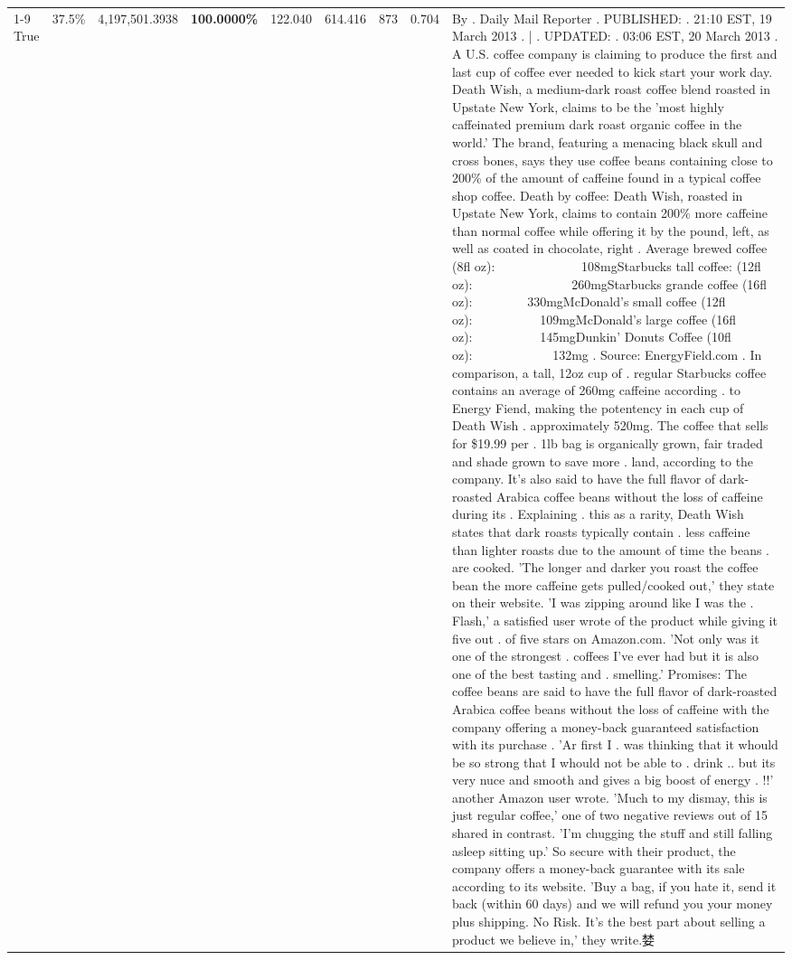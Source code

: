 \begin{table}[H]
{\begin{tabular}{lllrlllll}
\cline{1-9} \cline{2-9}
True & 37.5\% & 4,197,501.3938 & \bfseries \color{red} 100.0000\% & 122.040 & 614.416 & 873 & 0.704 & By . Daily Mail Reporter . PUBLISHED: . 21:10 EST, 19 March 2013 . | . UPDATED: . 03:06 EST, 20 March 2013 . A U.S. coffee company is claiming to produce the first and last cup of coffee ever needed to kick start your work day. Death Wish, a medium-dark roast coffee blend roasted in Upstate New York, claims to be the 'most highly caffeinated premium dark roast organic coffee in the world.' The brand, featuring a menacing black skull and cross bones, says they use coffee beans containing close to 200\% of the amount of caffeine found in a typical coffee shop coffee. Death by coffee: Death Wish, roasted in Upstate New York, claims to contain 200\% more caffeine than normal coffee while offering it by the pound, left, as well as coated in chocolate, right . Average brewed coffee (8fl oz):              108mgStarbucks tall coffee: (12fl oz):                260mgStarbucks grande coffee (16fl oz):         330mgMcDonald's small coffee (12fl oz):           109mgMcDonald's large coffee (16fl oz):           145mgDunkin' Donuts Coffee (10fl oz):             132mg . Source: EnergyField.com . In comparison, a tall, 12oz cup of . regular Starbucks coffee contains an average of 260mg caffeine according . to Energy Fiend, making the potentency in each cup of Death Wish . approximately 520mg. The coffee that sells for \$19.99 per . 1lb bag is organically grown, fair traded and shade grown to save more . land, according to the company. It's also said to have the full flavor of dark-roasted Arabica coffee beans without the loss of caffeine during its . Explaining . this as a rarity, Death Wish states that dark roasts typically contain . less caffeine than lighter roasts due to the amount of time the beans . are cooked. 'The longer and darker you roast the coffee bean the more caffeine gets pulled/cooked out,' they state on their website. 'I was zipping around like I was the . Flash,' a satisfied user wrote of the product while giving it five out . of five stars on Amazon.com. 'Not only was it one of the strongest . coffees I've ever had but it is also one of the best tasting and . smelling.’ Promises: The coffee beans are said to have the full flavor of dark-roasted Arabica coffee beans without the loss of caffeine with the company offering a money-back guaranteed satisfaction with its purchase . 'Ar first I . was thinking that it whould be so strong that I whould not be able to . drink .. but its very nuce and smooth and gives a big boost of energy . !!' another Amazon user wrote. 'Much to my dismay, this is just regular coffee,' one of two negative reviews out of 15 shared in contrast. 'I'm chugging the stuff and still falling asleep sitting up.' So secure with their product, the company offers a money-back guarantee with its sale according to its website. 'Buy a bag, if you hate it, send it back (within 60 days) and we will refund you your money plus shipping. No Risk. It’s the best part about selling a product we believe in,' they write.婪 \\

\end{tabular}}
\end{table}
